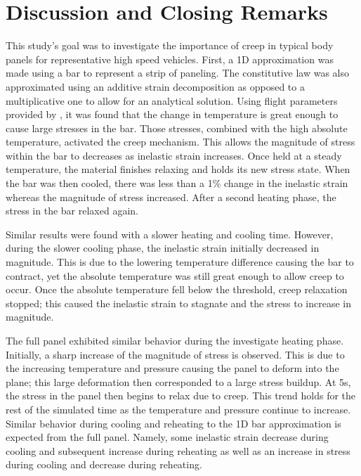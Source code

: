 \documentclass[conf]{new-aiaa}
\begin{document}
\section{Discussion and Closing Remarks} \label{sec_closing_remarks}

This study's goal was to investigate the importance of creep in typical 
body panels for representative high speed vehicles.
First, a 1D approximation was made using a bar to represent a strip of
paneling. 
The constitutive law was also approximated using an additive strain decomposition
as opposed to a multiplicative one to allow for an analytical solution.
Using flight parameters provided by 
\cite{culler_impact_of_FTS_coupling_on_response_prediction_hypersonic_skin_panels},
it was found that the change in temperature is great
enough to cause large stresses in the bar. 
Those stresses, combined with the high absolute temperature, activated the creep mechanism.
This allows the magnitude of stress within the bar to decreases as inelastic strain increases. 
Once held at a steady temperature, the material finishes relaxing and holds 
its new stress state. 
When the bar was then cooled, there was less than a 1\% change in the inelastic strain
whereas the magnitude of stress increased. 
After a second heating phase, the stress in the bar relaxed again. 

Similar results were found with a slower heating and cooling time.
However, during the slower cooling phase, the inelastic strain initially decreased in magnitude.
This is due to the lowering temperature difference causing the bar to contract,
yet the absolute temperature was still great enough to allow creep to occur. 
Once the absolute temperature fell below the threshold, creep relaxation 
stopped; this caused the inelastic strain to stagnate and the stress to increase
in magnitude. 

The full panel exhibited similar behavior during the investigate heating phase.
Initially, a sharp increase of the magnitude of stress is observed.
This is due to the increasing temperature and pressure causing the panel
to deform into the plane; 
this large deformation then corresponded to a large stress buildup.
At 5s, the stress in the panel then begins to relax due to creep.
This trend holds for the rest of the simulated time as the temperature and 
pressure continue to increase. 
Similar behavior during cooling and reheating to the 1D bar approximation 
is expected from the full panel. 
Namely, some inelastic strain decrease during cooling and subsequent 
increase during reheating as well as an increase in stress during cooling
and decrease during reheating.
\end{document}
